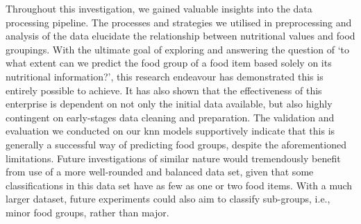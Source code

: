 \documentclass[11pt]{article}
\begin{document}
Throughout this investigation, we gained valuable insights into the data processing pipeline. The processes and strategies we utilised in preprocessing and analysis of the data elucidate the relationship between nutritional values and food groupings. With the ultimate goal of exploring and answering the question of ‘to what extent can we predict the food group of a food item based solely on its nutritional information?’,  this research endeavour has demonstrated this is entirely possible to achieve. It has also shown that the effectiveness of this enterprise is dependent on not only the initial data available, but also highly contingent on early-stages data cleaning and preparation. The validation and evaluation we conducted on our knn models supportively indicate that this is generally a successful way of predicting food groups, despite the aforementioned limitations. Future investigations of similar nature would tremendously benefit from use of a more well-rounded and balanced data set, given that some classifications in this data set have as few as one or two food items. With a much larger dataset, future experiments could also aim to classify sub-groups, i.e., minor food groups, rather than major.


\newpage


\end{document}
